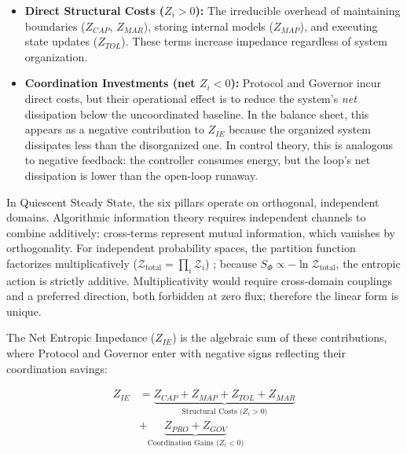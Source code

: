 \begin{itemize}
    \item \textbf{Direct Structural Costs ($Z_i > 0$):} The irreducible overhead of maintaining boundaries ($Z_{CAP}$, $Z_{MAR}$), storing internal models ($Z_{MAP}$), and executing state updates ($Z_{TOL}$). These terms increase impedance regardless of system organization.

    \item \textbf{Coordination Investments (net $Z_i < 0$):} Protocol and Governor incur direct costs, but their operational effect is to reduce the system's \emph{net} dissipation below the uncoordinated baseline. In the balance sheet, this appears as a negative contribution to $Z_{IE}$ because the organized system dissipates less than the disorganized one. In control theory, this is analogous to negative feedback: the controller consumes energy, but the loop's net dissipation is lower than the open-loop runaway.
\end{itemize}

In Quiescent Steady State, the six pillars operate on orthogonal, independent domains. Algorithmic information theory requires independent channels to combine additively: cross-terms represent mutual information, which vanishes by orthogonality. For independent probability spaces, the partition function factorizes multiplicatively ($\mathcal{Z}_{\text{total}} = \prod_i \mathcal{Z}_i$) 
\cite{jaynes_information_1957}; because $S_\Phi \propto -\ln \mathcal{Z}_{\text{total}}$, the entropic action is strictly additive. Multiplicativity would require cross-domain couplings 
and a preferred direction, both forbidden at zero flux; therefore the linear form is unique.

The Net Entropic Impedance ($Z_{IE}$) is the algebraic sum of these contributions, where Protocol and Governor enter with negative signs reflecting their coordination savings:

\begin{equation}
\label{eq:entropic_balance}
\begin{split}
    Z_{IE} &= \underbrace{Z_{CAP} + Z_{MAP} + Z_{TOL} + Z_{MAR}}_{\text{Structural Costs (}Z_i > 0\text{)}} \\
    &+ \underbrace{Z_{PRO} + Z_{GOV}}_{\text{Coordination Gains (}Z_i < 0\text{)}}
\end{split}
\end{equation}

